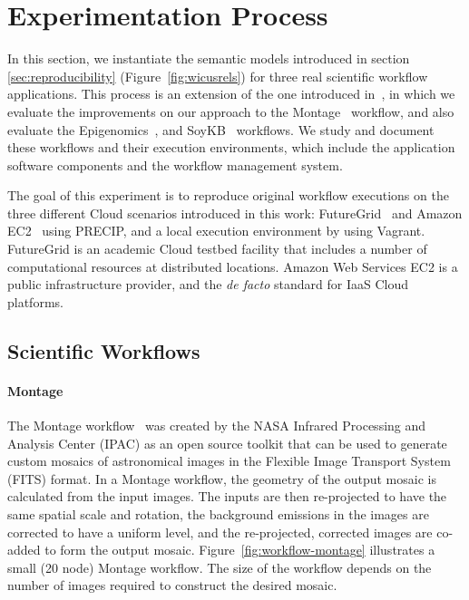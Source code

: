 \section{Experimentation Process}
\label{sec:experiment}


In this section, we instantiate the semantic models introduced in section \ref{sec:reproducibility}
(Figure~\ref{fig:wicusrels}) for three real scientific workflow applications. 
This process is an extension of the one introduced
 in~\cite{SantanaPerez-REPPAR-2014}, in which we evaluate the improvements on our
 approach to the Montage~\cite{Montage} workflow, and also evaluate the
 Epigenomics~\cite{genome}, and SoyKB~\cite{soybean, Joshi01012014} workflows.
We study and document these workflows and their execution environments, which include the application software components 
and the workflow management system.

The goal of this experiment is to reproduce original workflow executions on the three different 
Cloud scenarios introduced in this work: FutureGrid~\cite{futuregrid} and Amazon EC2~\cite{aws} 
using PRECIP, and a local execution environment by using Vagrant. 
FutureGrid is an academic Cloud testbed facility that includes a number of computational 
resources at distributed locations. Amazon Web Services EC2 is a public infrastructure 
provider, and the \emph{de facto} standard for IaaS Cloud platforms. 


\subsection{Scientific Workflows}

\paragraph{\textbf{Montage}}
The Montage workflow~\cite{Montage} was created by the NASA Infrared Processing 
and Analysis Center (IPAC) as an open source toolkit that can be used to generate 
custom mosaics of astronomical images in the Flexible Image Transport System (FITS) 
format. In a Montage workflow, the geometry of the output mosaic is calculated from the 
input images. The inputs are then re-projected to have the same spatial scale and rotation, 
the background emissions in the images are corrected to have a uniform level, and the 
re-projected, corrected images are co-added to form the output mosaic. 
Figure~\ref{fig:workflow-montage} illustrates a small (20 node) Montage workflow. The 
size of the workflow depends on the number of images required to construct the desired 
mosaic.

